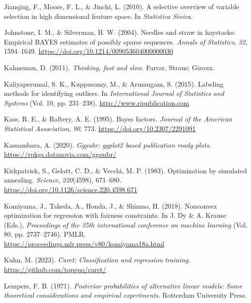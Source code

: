 \documentclass[
  11pt,
]{article}
\newlength{\cslhangindent}
\newlength{\cslentryspacingunit} %
\newenvironment{CSLReferences}[2] %
 {%
  \setlength{\parindent}{0pt}
  \ifodd #1
  \let\oldpar\par
  \def\par{\hangindent=\cslhangindent\oldpar}
  \fi
  \setlength{\parskip}{#2\cslentryspacingunit}
 }%
 {}
\begin{document}
\begin{CSLReferences}{1}{0}
\leavevmode{}%
Jianqing, F., Moore, F. L., \& Jinchi, L. (2010). A selective overview
of variable selection in high dimensional feature space. In
\emph{Statistica Sinica}.

\leavevmode{}%
Johnstone, I. M., \& Silverman, B. W. (2004). Needles and straw in
haystacks: Empirical BAYES estimates of possibly sparse sequences.
\emph{Annals of Statistics}, \emph{32}, 1594--1649.
\url{https://doi.org/10.1214/009053604000000030}

\leavevmode{}%
Kahneman, D. (2011). \emph{Thinking, fast and slow}. Farrar, Straus;
Giroux.

\leavevmode{}%
Kaliyaperumal, S. K., Kuppusamy, M., \& Arumugam, S. (2015). Labeling
methods for identifying outliers. In \emph{International Journal of
Statistics and Systems} (Vol. 10, pp. 231--238).
\url{http://www.ripublication.com}

\leavevmode{}%
Kass, R. E., \& Raftery, A. E. (1995). Bayes factors. \emph{Journal of
the American Statistical Association}, \emph{90}, 773.
\url{https://doi.org/10.2307/2291091}

\leavevmode{}%
Kassambara, A. (2020). \emph{Ggpubr: ggplot2 based publication ready
plots}. \url{https://rpkgs.datanovia.com/ggpubr/}

\leavevmode{}%
Kirkpatrick, S., Gelatt, C. D., \& Vecchi, M. P. (1983). Optimization by
simulated annealing. \emph{Science}, \emph{220}(4598), 671--680.
\url{https://doi.org/10.1126/science.220.4598.671}

\leavevmode{}%
Komiyama, J., Takeda, A., Honda, J., \& Shimao, H. (2018). Nonconvex
optimization for regression with fairness constraints. In J. Dy \& A.
Krause (Eds.), \emph{Proceedings of the 35th international conference on
machine learning} (Vol. 80, pp. 2737--2746). PMLR.
\url{https://proceedings.mlr.press/v80/komiyama18a.html}

\leavevmode{}%
Kuhn, M. (2023). \emph{Caret: Classification and regression training}.
\url{https://github.com/topepo/caret/}

\leavevmode{}%
Lempers, F. B. (1971). \emph{Posterior probabilities of alternative
linear models: Some theoretical considerations and empirical
experiments}. Rotterdam University Press.


\end{CSLReferences}
\end{document}
